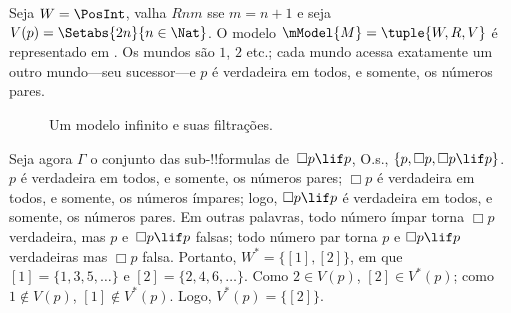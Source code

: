 \documentclass[../../../include/open-logic-section]{subfiles}
\begin{document}
\begin{ex}
  Seja $W = \PosInt$, valha $Rnm$ sse $m = n + 1$ e seja
  $V(p) = \Setabs{2n}{n \in \Nat}$. O modelo $\mModel{M} =
  \tuple{W, R, V}$ é representado em . Os
  mundos são $1$, $2$ etc.; cada mundo acessa exatamente um outro
  mundo---seu sucessor---e $p$ é verdadeira em todos, e somente, os
  números pares.

  \begin{figure}
    \centering

    \caption{Um modelo infinito e suas filtrações.}
  \end{figure}
  
  Seja agora $\Gamma$ o conjunto das sub-!!{formula}s de~$\Box p \lif p$,
  O.s.\@, $\{p, \Box p, \Box p \lif p\}$. $p$ é verdadeira em todos,
  e somente, os números pares; $\Box p$ é verdadeira em todos, e somente,
  os números ímpares; logo, $\Box p \lif p$ é verdadeira em todos, e
  somente, os números pares. Em outras palavras, todo número ímpar torna
  $\Box p$ verdadeira, mas $p$ e~$\Box p \lif p$ falsas; todo número par
  torna $p$ e $\Box p \lif p$ verdadeiras mas $\Box p$ falsa. Portanto,
  $W^* = \{ [1], [2] \}$, em que $[1] = \{1, 3, 5, \dots\}$ e
  $[2] = \{2, 4, 6, \dots\}$. Como $2 \in V(p)$, $[2] \in V^*(p)$;
  como $1 \notin V(p)$, $[1] \notin V^*(p)$. Logo, $V^*(p) = \{[2]\}$.


\end{ex}
\end{document}
